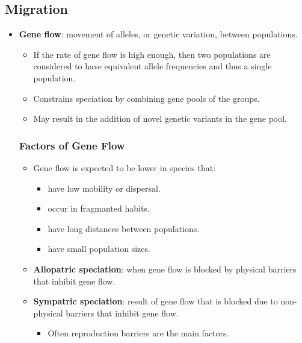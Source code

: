 \documentclass[12pt,a4paper]{article}
\begin{document}
\subsection{Migration}
\begin{itemize}
    \item \textbf{Gene flow}: movement of alleles, or genetic variation, between populations.
        \begin{itemize}
            \item If the rate of gene flow is high enough, then two populations are considered to have equivalent allele frequencies and thus a single population.
            \item Constrains speciation by combining gene pools of the groups.
            \item May result in the addition of novel genetic variants in the gene pool.
        \end{itemize}
    \subsubsection{Factors of Gene Flow}
    \begin{itemize}
        \item Gene flow is expected to be lower in species that:
            \begin{itemize}
                \item have low mobility or dispersal.
                \item occur in fragmanted habits.
                \item have long distances between populations.
                \item have small population sizes.
            \end{itemize}
        \item \textbf{Allopatric speciation}: when gene flow is blocked by {\color{o-Sun}physical} barriers that inhibit gene flow.
        \item \textbf{Sympatric speciation}: result of gene flow that is blocked due to {\color{o-Sun}non-physical} barriers that inhibit gene flow.
            \begin{itemize}
                \item Often reproduction barriers are the main factors.
            \end{itemize}
    \end{itemize} 
\end{itemize}
\end{document}

